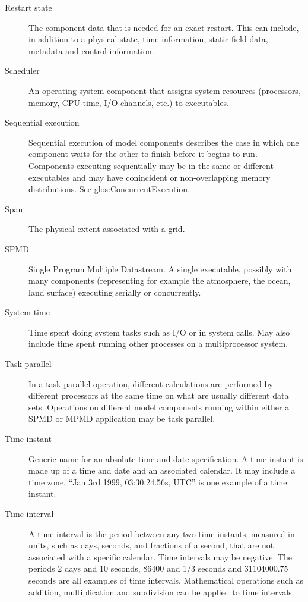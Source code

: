 \begin{description}
\item[Restart state] \label{glos:RestartState} The component 
  data that 
  is needed for an exact restart. This can include, in addition to 
  a physical state,  time information, static field data,
  metadata and control information. 

\item[Scheduler] \label{glos:Scheduler} An operating system component 
  that assigns system
  resources (processors, memory, CPU time, I/O channels, etc.) to
  executables.

\item[Sequential execution] \label{glos:SequentialExecution}
Sequential execution of model components describes the case in which 
one component waits for the other to finish before it begins
to run.  Components executing sequentially may be in the same or 
different executables and may have conincident or non-overlapping 
memory distributions.  See 
{glos:ConcurrentExecution}.

\item[Span] \label{glos:Span} The physical extent associated with a grid.

\item[SPMD] \label{glos:SPMD} Single Program Multiple Datastream. 
  A single executable, possibly with many 
  components (representing for example the atmosphere, the ocean, 
  land surface) executing serially or concurrently.

\item [System time] \label{glos:SysTime}Time spent doing system tasks such as I/O or in system calls.  May also
include time spent running other processes on a multiprocessor system.

\item[Task parallel] \label{glos:TaskParallel}  In a task parallel operation,
different calculations are performed by different processors at the same time
on what are usually different data sets.  Operations on different model 
components running within either a SPMD or MPMD application may be task 
parallel.  

\item [Time instant] \label{glos:TimeInstant}
Generic name for an absolute time and date specification. A time instant is made 
up of a time and date and an associated calendar. It may include a time zone.
``Jan 3rd 1999, 03:30:24.56s, UTC'' is one example of a time instant.

\item [Time interval] \label{glos:TimeInterval} A time interval is the
period between any two time instants, measured in units, such as days, 
seconds, and fractions of a second, that are not associated with a specific
calendar.  Time intervals may be negative.  The periods 2 days and 10 seconds, 
86400 and 1/3 seconds and 31104000.75 seconds are all examples of time intervals.  
Mathematical operations such as addition, multiplication and subdivision 
can be applied to time intervals.


\end{description}
